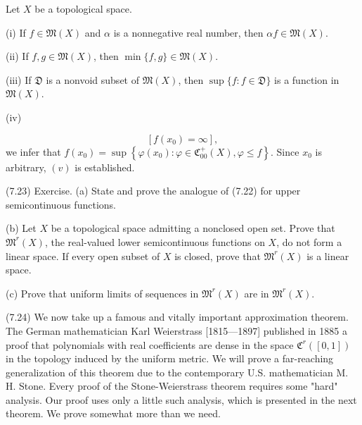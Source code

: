 Let $X$ be a topological space.

(i) If $f \in \mathfrak{M}(X)$ and $\alpha$ is a nonnegative real number, then $\alpha f \in \mathfrak{M}(X)$.

(ii) If $f, g \in \mathfrak{M}(X)$, then $\min \{f, g\} \in \mathfrak{M}(X)$.

(iii) If $\mathfrak{D}$ is a nonvoid subset of $\mathfrak{M}(X)$, then $\sup \{f : f \in \mathfrak{D}\}$ is a function in $\mathfrak{M}(X)$.

(iv)

$$[f(x_0) = \infty],$$ we infer that $f(x_0) = \sup \left\{ \varphi(x_0) : \varphi \in \mathfrak{C}_{00}^+(X), \varphi \leq f \right\}$. Since $x_0$ is arbitrary, $(v)$ is established.

(7.23) Exercise. (a) State and prove the analogue of (7.22) for upper semicontinuous functions.

(b) Let $X$ be a topological space admitting a nonclosed open set. Prove that $\mathfrak{M}^r(X)$, the real-valued lower semicontinuous functions on $X$, do not form a linear space. If every open subset of $X$ is closed, prove that $\mathfrak{M}^r(X)$ is a linear space.

(c) Prove that uniform limits of sequences in $\mathfrak{M}^r(X)$ are in $\mathfrak{M}^r(X)$.

(7.24) We now take up a famous and vitally important approximation theorem. The German mathematician Karl Weierstrass [1815—1897] published in 1885 a proof that polynomials with real coefficients are dense in the space $\mathfrak{C}^r([0, 1])$ in the topology induced by the uniform metric. We will prove a far-reaching generalization of this theorem due to the contemporary U.S. mathematician M. H. Stone. Every proof of the Stone-Weierstrass theorem requires some "hard" analysis. Our proof uses only a little such analysis, which is presented in the next theorem. We prove somewhat more than we need.